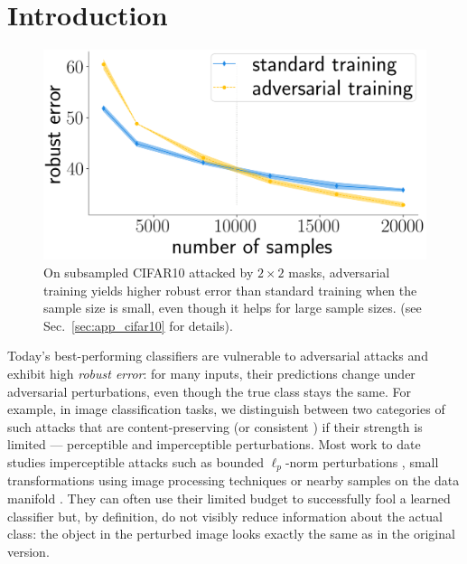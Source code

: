 \section{Introduction}
\label{sec:intro}
\begin{figure}
\centering
\vspace{-0.1in}
\includegraphics[width=0.99\linewidth]{plotsAistats/teaser_try_2.png}
\caption{
  On subsampled \mbox{CIFAR10} attacked by $2\times 2$ masks, adversarial training yields higher robust error than standard training
  when the sample size is small, even though it helps for large sample sizes.
  (see Sec.~\ref{sec:app_cifar10} for details).}
  \vspace{-0.2in}
\label{fig:teaserplot}
\end{figure}

Today's best-performing classifiers are vulnerable to adversarial attacks
\cite{goodfellow15, szegedy14} and exhibit high \emph{robust error}: for many inputs, their predictions change under adversarial perturbations,
even though the true class stays the same. 
For example, in image classification tasks, we distinguish between two categories of
such attacks that are content-preserving \cite{gilmer18b} (or consistent \cite{raghunathan20}) if their strength is limited --- perceptible and imperceptible perturbations.
Most work to date studies imperceptible attacks such as 
bounded $\ell_p$-norm perturbations \cite{goodfellow15, madry18, moosavi16}, small transformations using image processing
techniques \cite{ghiasi19, zhao20, laidlaw21, Luo18} or 
nearby samples on the data manifold \cite{Lin20, Zhou20}.
They can often use their limited budget to successfully fool a learned classifier but, by definition, do not visibly reduce information about the actual class: the object in the perturbed image looks exactly the same as in the original version.

